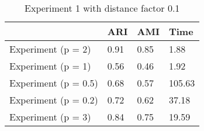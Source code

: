 \begin{table}
\centering
\caption{Experiment 1 with distance factor 0.1}
\begin{tabular}{llll}
\toprule
{} &   ARI &   AMI &    Time \\
\midrule
Experiment (p = 2)   &  0.91 &  0.85 &    1.88 \\
Experiment (p = 1)   &  0.56 &  0.46 &    1.92 \\
Experiment (p = 0.5) &  0.68 &  0.57 &  105.63 \\
Experiment (p = 0.2) &  0.72 &  0.62 &   37.18 \\
Experiment (p = 3)   &  0.84 &  0.75 &   19.59 \\
\bottomrule
\end{tabular}
\end{table}
